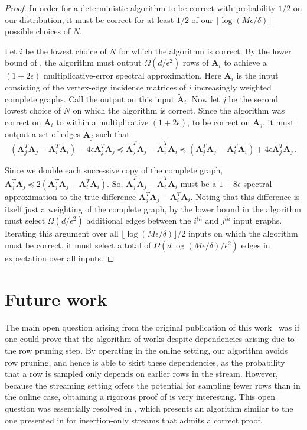 \documentclass[11pt]{article}
\numberwithin{equation}{section}
\theoremstyle{definition}
\theoremstyle{plain}
\newcommand{\bv}[1]{\mathbf{#1}}
\begin{document}
\begin{proof}
In order for a deterministic algorithm to be correct with probability $1/2$ on our distribution, it must be correct for at least $1/2$ of our $\lfloor \log(M\epsilon/\delta) \rfloor$ possible choices of $N$.

Let $i$ be the lowest choice of $N$ for which the algorithm is correct. By the lower bound of \cite{batson2012twice}, the algorithm must output  $\Omega(d/\epsilon^2)$ rows of $\bv{A}_i$ to achieve a $(1+2\epsilon)$ multiplicative-error spectral approximation. Here $\bv{A}_i$ is the input consisting of the vertex-edge incidence matrices of $i$ increasingly weighted complete graphs. Call the output on this input $\bv{\tilde A}_i$.
Now let $j$ be the second lowest choice of $N$ on which the algorithm is correct. Since the algorithm was correct on $\bv{A}_i$ to within a multiplicative $(1+2\epsilon)$, to be correct on $\bv{A}_j$, 
it must output a set of edges $\bv{\tilde A}_j$ such that 
$$
(\bv{A}_j^T \bv{A}_j- \bv{A}_i^T \bv{A}_i) - 4 \epsilon \bv{A}_j^T \bv{A}_j \preceq \bv{\tilde A}_j^T\bv{\tilde A}_j - \bv{\tilde A}_i^T\bv{\tilde A}_i \preceq (\bv{A}_j^T \bv{A}_j- \bv{A}_i^T \bv{A}_i) + 4 \epsilon \bv{A}_j^T \bv{A}_j\,.
$$

Since we double each successive copy of the complete graph, $\bv{A}_j^T \bv{A}_j \preceq 2(\bv{A}_j^T \bv{A}_j- \bv{A}_i^T \bv{A}_i)$. So, $\bv{\tilde A}_j^T\bv{\tilde A}_j - \bv{\tilde A}_i^T\bv{\tilde A}_i$ must be a $1+8\epsilon$ spectral approximation to the true difference $\bv{A}_j^T \bv{A}_j - \bv{A}_i^T \bv{A}_i$. Noting that this difference is itself just a weighting of the complete graph, by the lower bound in \cite{batson2012twice} the algorithm must select $\Omega(d/\epsilon^2)$ additional edges between the $i^{th}$ and $j^{th}$ input graphs. Iterating this argument over all $\lfloor \log(M\epsilon/\delta) \rfloor/2$ inputs on which the algorithm must be correct, it must select a total of $\Omega(d\log(M\epsilon/\delta)/\epsilon^2)$ edges in expectation over all inputs. 
\end{proof}

\section{Future work}

The main open question arising from the original publication of this
work~\cite{conf-version}
was if one could prove that the algorithm of \cite{kelner2013spectral} works despite dependencies arising due to the row pruning step. By operating in the online setting, our algorithm avoids row pruning, and hence is able to skirt these dependencies, as the probability that a row is sampled only depends on earlier rows in the stream. However, because the streaming setting offers the potential for sampling fewer rows than in the online case, obtaining a rigorous proof of \cite{kelner2013spectral} is very interesting. This open question was essentially resolved in %
\cite{kyng2017framework}, which presents
%
an algorithm similar to the one presented in  %
\cite{kelner2013spectral} 
for insertion-only streams that admits a correct proof.
%
%
\end{document}

